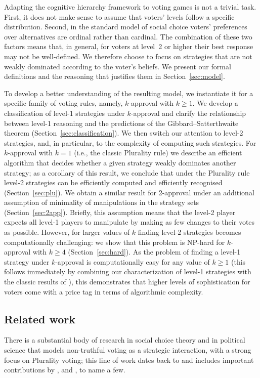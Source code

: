 \documentclass[11pt]{article}
\begin{document}
Adapting the cognitive hierarchy framework to voting games is not a trivial task.
First, it does not make sense to assume that voters' levels follow a specific distribution.
Second, in the standard model of social choice voters' preferences over alternatives
are ordinal rather than cardinal. The combination of these two factors means that, 
in general, for voters at level~2 or higher their best response may not be well-defined.
We therefore choose to focus on strategies that are not weakly dominated according
to the voter's beliefs. We present our formal definitions and the reasoning that
justifies them in Section~\ref{sec:model}.

To develop a better understanding of the resulting model, we instantiate it for a specific family
of voting rules, namely, $k$-approval with $k\ge 1$. We develop a classification of \mbox{level-1} 
strategies under $k$-approval and clarify the relationship between level-1 reasoning and the predictions of the 
Gibbard--Satterthwaite theorem (Section~\ref{sec:classification}). We then switch our attention to level-2 strategies, 
and, in particular, to the complexity of computing such strategies.
For $k$-approval with $k=1$ (i.e., the classic Plurality rule) we describe an efficient algorithm 
that decides whether a given strategy weakly dominates another strategy; as a corollary of this result, 
we conclude that under the Plurality rule level-2 strategies can be efficiently computed 
and efficiently recognised (Section~\ref{sec:plu}). We obtain a similar result for 2-approval under an additional assumption
of minimality of manipulations in the strategy sets (Section~\ref{sec:2app}). Briefly, this assumption means that the level-2 player expects all level-1 players
to manipulate by making as few changes to their votes as possible. However, for larger values of $k$
finding level-2 strategies becomes computationally challenging: we show that this problem
is NP-hard for $k$-approval with $k\ge 4$ (Section~\ref{sec:hard}). As the problem of finding a level-1 strategy
under $k$-approval is computationally easy for any value of $k\ge 1$ (this follows immediately
by combining our characterization of level-1 strategies with the classic results of \citet{btt89}),
this demonstrates that higher levels of sophistication for voters come with a price tag in terms
of algorithmic complexity.


\subsection{Related work}\label{sec:related}
There is a substantial body of research in social choice theory and in political science 
that models non-truthful voting as a strategic interaction,
with a strong focus on Plurality voting;
this line of work dates back to \citet{far:b:voting} and includes important contributions 
by \citet{Cain1978}, \citet{fed-sen-wri:j:entry} and \citet{Cox1997}, to name a few. 
\end{document}
